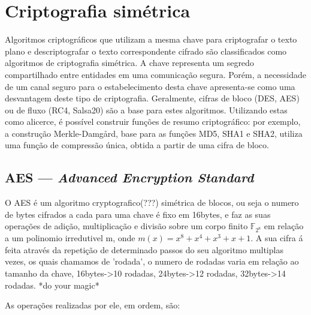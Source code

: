 \documentclass{article}
\begin{document}
\section{Criptografia simétrica}

Algoritmos criptográficos que utilizam a mesma chave para criptografar o
texto plano e descriptografar o texto correspondente cifrado são classificados
como algoritmos de criptografia simétrica. A chave representa um segredo
compartilhado entre entidades em uma comunicação segura. Porém, a necessidade
de um canal seguro para o estabelecimento desta chave apresenta-se como uma
desvantagem deste tipo de criptografia. Geralmente, cifras de bloco (DES, AES)
ou de fluxo (RC4, Salsa20) são a base para estes algoritmos. Utilizando estas
como alicerce, é possível construir funções de resumo criptográfico: por
exemplo, a construção Merkle-Damgård, base para as funções MD5, SHA1 e SHA2,
utiliza uma função de compressão única, obtida a partir de uma cifra de bloco.

\subsection{AES --- \emph{Advanced Encryption Standard}}

O AES é um algoritmo cryptografico(???) simétrica de blocos, ou seja o numero de bytes cifrados a cada para uma chave é fixo em 16bytes, e faz as suas operações de adição, multiplicação e divisão sobre um corpo finito $\mathbb{F}_{2^{8}}$ em relação a um polinomio irredutivel m, onde $m(x) = x^{8} + x^{4} + x^{3} + x + 1$. 
A sua cifra á feita através da repetição de determinado passos do seu algoritmo multiplas vezes, os quais chamamos de 'rodada', o numero de rodadas varia em relação ao tamanho da chave, 16bytes->10 rodadas, 24bytes->12 rodadas, 32bytes->14 rodadas. *do your magic*


As operações realizadas por ele, em ordem, são:
\end{document}
